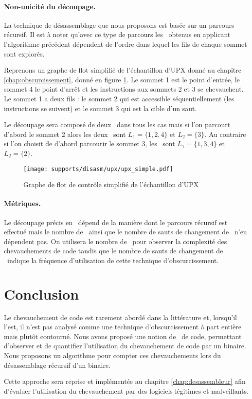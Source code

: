 \paragraph{Non-unicité du découpage.}
La technique de désassemblage que nous proposons est basée sur un parcours récursif. Il est à noter qu'avec ce type de parcours les \layers\ obtenus en applicant l'algorithme précédent dépendent de l'ordre dans lequel les fils de chaque sommet sont explorés.

Reprenons un graphe de flot simplifié de l'échantillon d'UPX donné au chapitre \ref{chap:obscurcissement}, donné en figure \ref{fig:upx_cfg_simple}. Le sommet 1 est le point d'entrée, le sommet 4 le point d'arrêt et les instructions aux sommets 2 et 3 se chevauchent. Le sommet 1 a deux fils : le sommet 2 qui est accessible séquentiellement (les instructions se suivent) et le sommet 3 qui est la cible d'un saut.

Le découpage sera composé de deux \layers\ dans tous les cas mais si l'on parcourt d'abord le sommet 2 alors les deux \layers\ sont $L_1=\{1, 2, 4\}$ et $L_2=\{3\}$. Au contraire si l'on choisit de d'abord parcourir le sommet 3, les \layers\ sont $L_1=\{1, 3, 4\}$ et $L_2=\{2\}$.

\begin{figure}
\begin{center}
\texttt{[image: supports/disasm/upx/upx\_simple.pdf]}
\end{center}
\caption{Graphe de flot de contrôle simplifié de l'échantillon d'UPX}
\label{fig:upx_cfg_simple}
\end{figure}

\paragraph{Métriques.}
Le découpage précis en \layers\ dépend de la manière dont le parcours récursif est effectué mais  le nombre de \layers\ ainsi que le nombre de sauts de changement de \layers\ n'en dépendent pas.
On utilisera le nombre de \layers\ pour observer la complexité des chevauchements de code tandis que le nombre de sauts de changement de \layers\ indique la fréquence d'utilisation de cette technique d'obscurcissement.



\section*{Conclusion}
Le chevauchement de code est rarement abordé dans la littérature et, lorsqu'il l'est, il n'est pas analysé comme une technique d'obscurcissement à part entière mais plutôt contourné.
Nous avons proposé une notion de \layer\ de code, permettant d'observer et de quantifier l'utilisation du chevauchement de code par un binaire. Nous proposons un algorithme pour compter ces chevauchements lors du désassemblage récursif d'un binaire.

Cette approche sera reprise et implémentée au chapitre \ref{chap:desassembleur} afin d'évaluer l'utilisation du chevauchement par des logiciels légitimes et malveillants.